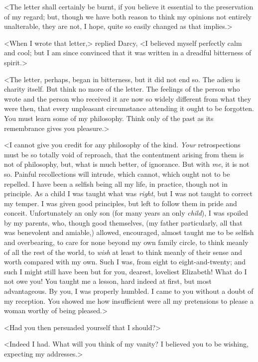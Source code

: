 <The letter shall certainly be burnt, if you believe it essential to the preservation of my regard; but, though we have both reason to think my opinions not entirely unalterable, they are not, I hope, quite so easily changed as that implies.>

<When I wrote that letter,> replied Darcy, <I believed myself perfectly calm and cool; but I am since convinced that it was written in a dreadful bitterness of spirit.>

<The letter, perhaps, began in bitterness, but it did not end so. The adieu is charity itself. But think no more of the letter. The feelings of the person who wrote and the person who received it are now so widely different from what they were then, that every unpleasant circumstance attending it ought to be forgotten. You must learn some of my philosophy. Think only of the past as its remembrance gives you pleasure.>

<I cannot give you credit for any philosophy of the kind. \textit{Your} retrospections must be so totally void of reproach, that the contentment arising from them is not of philosophy, but, what is much better, of ignorance. But with \textit{me}, it is not so. Painful recollections will intrude, which cannot, which ought not to be repelled. I have been a selfish being all my life, in practice, though not in principle. As a child I was taught what was \textit{right}, but I was not taught to correct my temper. I was given good principles, but left to follow them in pride and conceit. Unfortunately an only son (for many years an only \textit{child}), I was spoiled by my parents, who, though good themselves, (my father particularly, all that was benevolent and amiable,) allowed, encouraged, almost taught me to be selfish and overbearing, to care for none beyond my own family circle, to think meanly of all the rest of the world, to \textit{wish} at least to think meanly of their sense and worth compared with my own. Such I was, from eight to eight-and-twenty; and such I might still have been but for you, dearest, loveliest Elizabeth! What do I not owe you! You taught me a lesson, hard indeed at first, but most advantageous. By you, I was properly humbled. I came to you without a doubt of my reception. You showed me how insufficient were all my pretensions to please a woman worthy of being pleased.>

<Had you then persuaded yourself that I should?>

<Indeed I had. What will you think of my vanity? I believed you to be wishing, expecting my addresses.>

